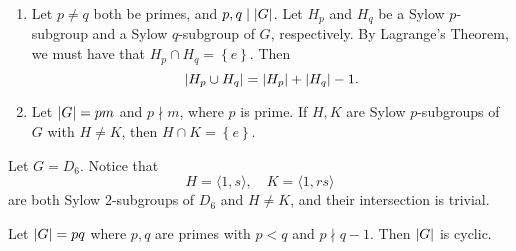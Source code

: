 \documentclass[notoc,notitlepage]{tufte-book}
\begin{document}
\begin{remark}
  \begin{enumerate}
    \item Let $p \neq q$ both be primes, and $p, q \mid \left| G \right|$. Let
      $H_p$ and $H_q$ be a Sylow $p$-subgroup and a Sylow $q$-subgroup of $G$,
      respectively. By Lagrange's Theorem, we must have that
      $H_p \cap H_q = \left\{ e \right\}$. Then
      \begin{equation*}
        \left| H_p \cup H_q \right| = \left| H_p \right| + \left| H_q \right| - 1.
      \end{equation*}

    \item Let $\left| G \right| = pm$ and $p \nmid m$, where $p$ is prime. If $H, K$ are
      Sylow $p$-subgroups of $G$ with $H \neq K$, then $H \cap K = \left\{ e \right\}$.
  \end{enumerate}
\end{remark}

\begin{eg}
  Let $G = D_6$. Notice that
  \begin{equation*}
    H = \langle 1, s \rangle, \quad K = \langle 1, rs \rangle
  \end{equation*}
  are both Sylow $2$-subgroups of $D_6$ and $H \neq K$, and their intersection is
  trivial.
\end{eg}

\begin{eg}
  Let $\left| G \right| = pq$ where $p, q$ are primes with $p < q$ and $p \nmid q - 1$.
  Then $\left|G\right|$ is cyclic.
\end{eg}
\end{document}
